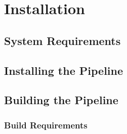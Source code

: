 \section{Installation}
\label{sec:installation}


\subsection{System Requirements}
\label{sec:platforms}

\subsection{Installing the \instrument{} Pipeline}
\label{sec:install-howto}

\subsection{Building the \instrument{} Pipeline}
\label{sec:compile-howto}

\subsubsection{Build Requirements}
\label{sec:compile-requirements}

